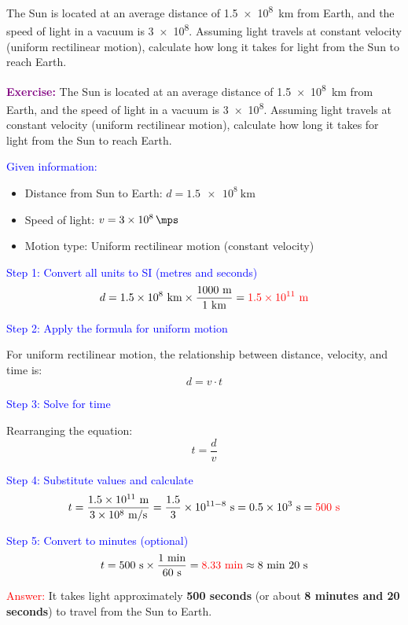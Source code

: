 \begin{exercise}
    The Sun is located at an average distance of \qty{1.5e8}{\kilo\m} from Earth, and the speed of light in a vacuum is \qty{3e8}{\mps}. Assuming light travels at constant velocity (uniform rectilinear motion), calculate how long it takes for light from the Sun to reach Earth.

    \begin{solu}
        \textbf{\textcolor{purple}{Exercise:}} The Sun is located at an average distance of \qty{1.5e8}{\kilo\m} from Earth, and the speed of light in a vacuum is \qty{3e8}{\mps}. Assuming light travels at constant velocity (uniform rectilinear motion), calculate how long it takes for light from the Sun to reach Earth.

        \vspace{0.3cm}

        \textcolor{blue}{Given information:}
        \begin{itemize}
            \item Distance from Sun to Earth: $d = \qty{1.5e8}{\kilo\m}$
            \item Speed of light: $v = \qty{3e8}{\mps}$
            \item Motion type: Uniform rectilinear motion (constant velocity)
        \end{itemize}

        \textcolor{blue}{Step 1: Convert all units to SI (metres and seconds)}
        \[
            d = 1.5 \times 10^8 \text{ km} \times \frac{1000 \text{ m}}{1 \text{ km}} = \textcolor{red}{1.5 \times 10^{11} \text{ m}}
        \]

        \textcolor{blue}{Step 2: Apply the formula for uniform motion}

        For uniform rectilinear motion, the relationship between distance, velocity, and time is:
        \[
            \boxed{d = v \cdot t}
        \]

        \textcolor{blue}{Step 3: Solve for time}

        Rearranging the equation:
        \[
            t = \frac{d}{v}
        \]

        \textcolor{blue}{Step 4: Substitute values and calculate}
        \[
            t = \frac{1.5 \times 10^{11} \text{ m}}{3 \times 10^8 \text{ m/s}} = \frac{1.5}{3} \times 10^{11-8} \text{ s} = 0.5 \times 10^3 \text{ s} = \textcolor{red}{500 \text{ s}}
        \]

        \textcolor{blue}{Step 5: Convert to minutes (optional)}
        \[
            t = 500 \text{ s} \times \frac{1 \text{ min}}{60 \text{ s}} = \textcolor{red}{8.33 \text{ min}} \approx 8 \text{ min } 20 \text{ s}
        \]

        \textcolor{red}{Answer:} It takes light approximately \textbf{500 seconds} (or about \textbf{8 minutes and 20 seconds}) to travel from the Sun to Earth.
    \end{solu}
\end{exercise}


